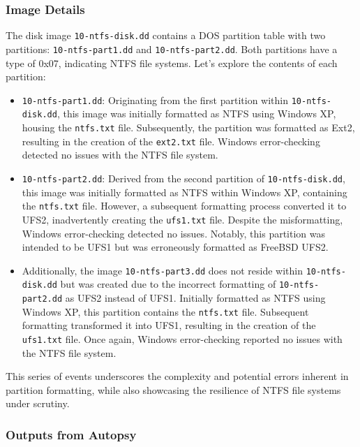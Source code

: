 \documentclass{article}
\begin{document}
\subsubsection*{Image Details}

The disk image \texttt{10-ntfs-disk.dd} contains a DOS partition table with two partitions: \texttt{10-ntfs-part1.dd} and \texttt{10-ntfs-part2.dd}. Both partitions have a type of 0x07, indicating NTFS file systems. Let's explore the contents of each partition:

\begin{itemize}
    \item \texttt{10-ntfs-part1.dd}: Originating from the first partition within \texttt{10-ntfs-disk.dd}, this image was initially formatted as NTFS using Windows XP, housing the \texttt{ntfs.txt} file. Subsequently, the partition was formatted as Ext2, resulting in the creation of the \texttt{ext2.txt} file. Windows error-checking detected no issues with the NTFS file system.
    
    \item \texttt{10-ntfs-part2.dd}: Derived from the second partition of \texttt{10-ntfs-disk.dd}, this image was initially formatted as NTFS within Windows XP, containing the \texttt{ntfs.txt} file. However, a subsequent formatting process converted it to UFS2, inadvertently creating the \texttt{ufs1.txt} file. Despite the misformatting, Windows error-checking detected no issues. Notably, this partition was intended to be UFS1 but was erroneously formatted as FreeBSD UFS2.
    
    \item Additionally, the image \texttt{10-ntfs-part3.dd} does not reside within \texttt{10-ntfs-disk.dd} but was created due to the incorrect formatting of \texttt{10-ntfs-part2.dd} as UFS2 instead of UFS1. Initially formatted as NTFS using Windows XP, this partition contains the \texttt{ntfs.txt} file. Subsequent formatting transformed it into UFS1, resulting in the creation of the \texttt{ufs1.txt} file. Once again, Windows error-checking reported no issues with the NTFS file system.
\end{itemize}

This series of events underscores the complexity and potential errors inherent in partition formatting, while also showcasing the resilience of NTFS file systems under scrutiny.

\subsubsection*{Outputs from Autopsy}
\end{document}
